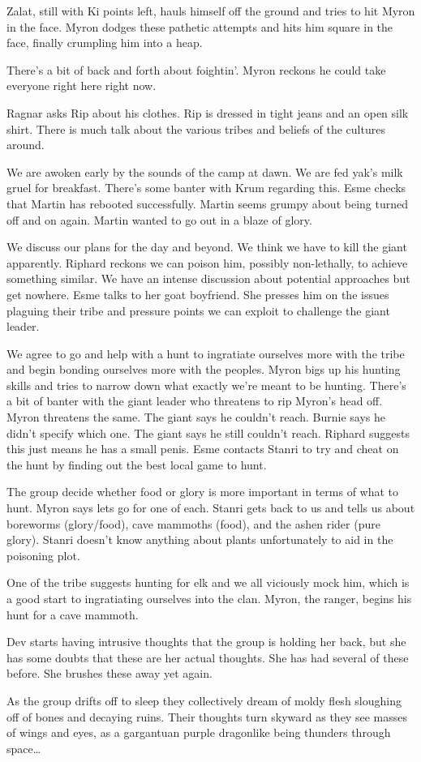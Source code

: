 Zalat, still with Ki points left, hauls himself off the ground and tries to hit Myron in the face. Myron dodges these pathetic attempts and hits him square in the face, finally crumpling him into a heap.\medskip

There’s a bit of back and forth about foightin’. Myron reckons he could take everyone right here right now.\medskip

Ragnar asks Rip about his clothes. Rip is dressed in tight jeans and an open silk shirt. There is much talk about the various tribes and beliefs of the cultures around.\medskip

We are awoken early by the sounds of the camp at dawn. We are fed yak’s milk gruel for breakfast. There’s some banter with Krum regarding this. Esme checks that Martin has rebooted successfully. Martin seems grumpy about being turned off and on again. Martin wanted to go out in a blaze of glory.\medskip

We discuss our plans for the day and beyond. We think we have to kill the giant apparently. Riphard reckons we can poison him, possibly non-lethally, to achieve something similar. We have an intense discussion about potential approaches but get nowhere. Esme talks to her goat boyfriend. She presses him on the issues plaguing their tribe and pressure points we can exploit to challenge the giant leader.\medskip

We agree to go and help with a hunt to ingratiate ourselves more with the tribe and begin bonding ourselves more with the peoples. Myron bigs up his hunting skills and tries to narrow down what exactly we’re meant to be hunting. There’s a bit of banter with the giant leader who threatens to rip Myron's head off. Myron threatens the same. The giant says he couldn’t reach. Burnie says he didn’t specify which one. The giant says he still couldn’t reach. Riphard suggests this just means he has a small penis. Esme contacts Stanri to try and cheat on the hunt by finding out the best local game to hunt.\medskip

The group decide whether food or glory is more important in terms of what to hunt. Myron says lets go for one of each. Stanri gets back to us and tells us about boreworms (glory/food), cave mammoths (food), and the ashen rider (pure glory). Stanri doesn’t know anything about plants unfortunately to aid in the poisoning plot.\medskip

One of the tribe suggests hunting for elk and we all viciously mock him, which is a good start to ingratiating ourselves into the clan. Myron, the ranger, begins his hunt for a cave mammoth.\medskip

Dev starts having intrusive thoughts that the group is holding her back, but she has some doubts that these are her actual thoughts. She has had several of these before. She brushes these away yet again.\medskip

As the group drifts off to sleep they collectively dream of moldy flesh sloughing off of bones and decaying ruins. Their thoughts turn skyward as they see masses of wings and eyes, as a gargantuan purple dragonlike being thunders through space…\medskip

\vspace*{5mm}
